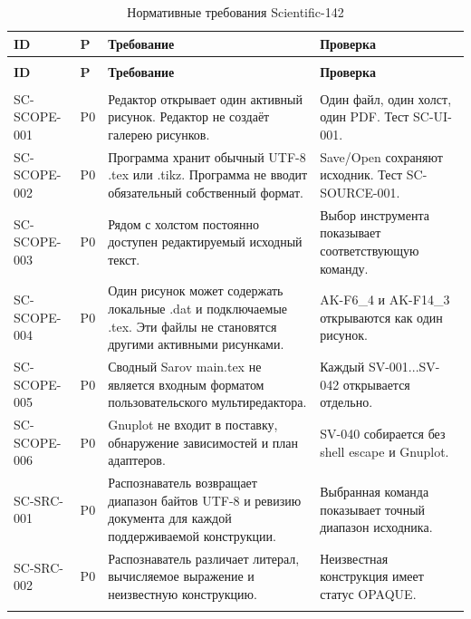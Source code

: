 \documentclass[11pt,a4paper,oneside]{scrreprt}
\begin{document}
\clearpage
\begin{longtable}{@{}>{\raggedright\arraybackslash}p{2.35cm}>{\raggedright\arraybackslash}p{0.75cm}>{\raggedright\arraybackslash}p{6.35cm}>{\raggedright\arraybackslash}p{5.2cm}@{}}
\caption{Нормативные требования Scientific-142} \\

\toprule
\textbf{ID} & \textbf{P} & \textbf{Требование} & \textbf{Проверка} \\ \midrule
\endfirsthead
\multicolumn{4}{@{}l}{\small Продолжение таблицы требований} \\ \midrule
\textbf{ID} & \textbf{P} & \textbf{Требование} & \textbf{Проверка} \\ \midrule
\endhead
\midrule \multicolumn{4}{r}{\footnotesize Продолжение на следующей странице} \\ \endfoot
\bottomrule \endlastfoot
\footnotesize SC-SCOPE-001 & P0 & Редактор открывает один активный рисунок. Редактор не создаёт галерею рисунков. & Один файл, один холст, один PDF. Тест SC-UI-001. \\ \addlinespace[2pt]
\footnotesize SC-SCOPE-002 & P0 & Программа хранит обычный UTF-8 .tex или .tikz. Программа не вводит обязательный собственный формат. & Save/Open сохраняют исходник. Тест SC-SOURCE-001. \\ \addlinespace[2pt]
\footnotesize SC-SCOPE-003 & P0 & Рядом с холстом постоянно доступен редактируемый исходный текст. & Выбор инструмента показывает соответствующую команду. \\ \addlinespace[2pt]
\footnotesize SC-SCOPE-004 & P0 & Один рисунок может содержать локальные .dat и подключаемые .tex. Эти файлы не становятся другими активными рисунками. & AK-F6\_4 и AK-F14\_3 открываются как один рисунок. \\ \addlinespace[2pt]
\footnotesize SC-SCOPE-005 & P0 & Сводный Sarov main.tex не является входным форматом пользовательского мультиредактора. & Каждый SV-001...SV-042 открывается отдельно. \\ \addlinespace[2pt]
\footnotesize SC-SCOPE-006 & P0 & Gnuplot не входит в поставку, обнаружение зависимостей и план адаптеров. & SV-040 собирается без shell escape и Gnuplot. \\ \addlinespace[2pt]
\footnotesize SC-SRC-001 & P0 & Распознаватель возвращает диапазон байтов UTF-8 и ревизию документа для каждой поддерживаемой конструкции. & Выбранная команда показывает точный диапазон исходника. \\ \addlinespace[2pt]
\footnotesize SC-SRC-002 & P0 & Распознаватель различает литерал, вычисляемое выражение и неизвестную конструкцию. & Неизвестная конструкция имеет статус OPAQUE. \\ \addlinespace[2pt]

\end{longtable}
\end{document}
